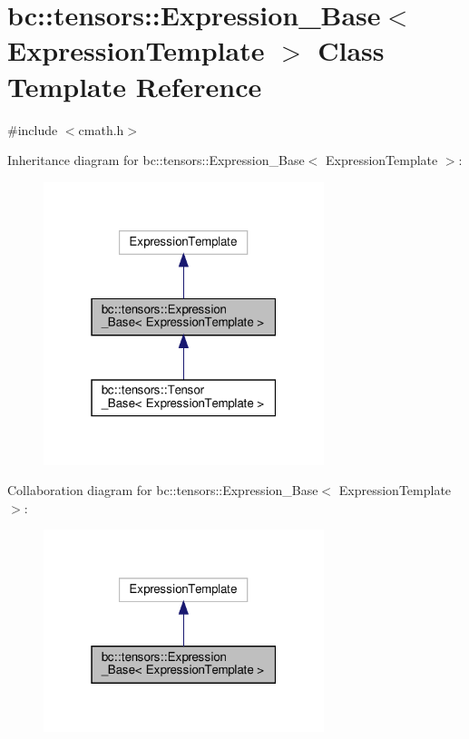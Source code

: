 \hypertarget{classbc_1_1tensors_1_1Expression__Base}{}\section{bc\+:\+:tensors\+:\+:Expression\+\_\+\+Base$<$ Expression\+Template $>$ Class Template Reference}
\label{classbc_1_1tensors_1_1Expression__Base}


{\ttfamily \#include $<$cmath.\+h$>$}



Inheritance diagram for bc\+:\+:tensors\+:\+:Expression\+\_\+\+Base$<$ Expression\+Template $>$\+:\nopagebreak
\begin{figure}[H]
\begin{center}
\leavevmode
\includegraphics[width=232pt]{classbc_1_1tensors_1_1Expression__Base__inherit__graph}
\end{center}
\end{figure}


Collaboration diagram for bc\+:\+:tensors\+:\+:Expression\+\_\+\+Base$<$ Expression\+Template $>$\+:\nopagebreak
\begin{figure}[H]
\begin{center}
\leavevmode
\includegraphics[width=232pt]{classbc_1_1tensors_1_1Expression__Base__coll__graph}
\end{center}
\end{figure}
